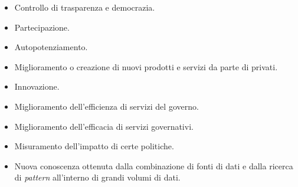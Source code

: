 \begin{itemize}
    \item Controllo di trasparenza e democrazia.
    \item Partecipazione.
    \item Autopotenziamento.
    \item Miglioramento o creazione di nuovi prodotti e servizi da parte di privati.
    \item Innovazione.
    \item Miglioramento dell'efficienza di servizi del governo.
    \item Miglioramento dell'efficacia di servizi governativi.
    \item Misuramento dell'impatto di certe politiche.
    \item Nuova conoscenza ottenuta dalla combinazione di fonti di dati e dalla ricerca di \textit{pattern} all'interno di grandi volumi di dati.
\end{itemize}


